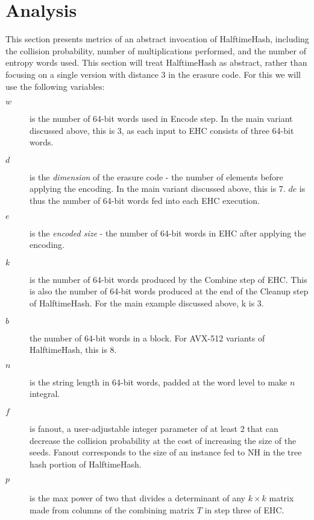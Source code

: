 \documentclass[acmsmall, nonacm]{acmart}
\begin{document}


\section{Analysis}
\label{analysis}

This section presents metrics of an abstract invocation of HalftimeHash, including the collision probability, number of multiplications performed, and the number of entropy words used.
This section will treat HalftimeHash as abstract, rather than focusing on a single version with distance 3 in the erasure code.
For this we will use the following variables:

\begin {description}
\item[$w$] is the number of 64-bit words used in Encode step.
  In the main variant discussed above, this is 3, as each input to EHC consists of three 64-bit words.
\item[$d$] is the {\em dimension} of the erasure code - the number of elements before applying the encoding.
  In the main variant discussed above, this is 7.
  $de$ is thus the number of 64-bit words fed into each EHC execution.
\item[$e$] is the {\em encoded size} - the number of 64-bit words in EHC after applying the encoding.
\item[$k$] is the number of 64-bit words produced by the Combine step of EHC.
  This is also the number of 64-bit words produced at the end of the Cleanup step of HalftimeHash.
  For the main example discussed above, k is 3.
\item[$b$] the number of 64-bit words in a block.
  For AVX-512 variants of HalftimeHash, this is 8.
\item[$n$] is the string length in 64-bit words, padded at the word level to make $n$ integral.
\item[$f$] is fanout, a user-adjustable integer parameter of at least 2 that can decrease the collision probability at the cost of increasing the size of the seeds.
  Fanout corresponds to the size of an instance fed to NH in the tree hash portion of HalftimeHash.
\item[$p$] is the max power of two that divides a determinant of any $k \times k$ matrix made from columns of the combining matrix $T$ in step three of EHC.
\end{description}
\end{document}
